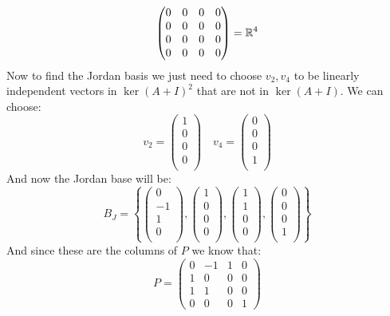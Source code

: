 \documentclass[11pt, a4paper]{article}
\begin{document}
\begin{solution}
\begin{align*}
    \left(\begin{matrix}
    0 & 0 & 0 & 0 \\
    0 & 0 & 0 & 0 \\
    0 & 0 & 0 & 0 \\
    0 & 0 & 0 & 0
    \end{matrix}\right) = \mathbb{R}^4
  \end{align*}
  Now to find the Jordan basis we just need to choose $v_2, v_4$ to
  be linearly independent vectors in $\ker(A+I)^2$ that are not in
  $\ker(A+I)$. We can choose:
  \[
    v_2 = \begin{pmatrix}1 \\ 0\\ 0\\ 0\\ \end{pmatrix} \quad
    v_4 = \begin{pmatrix}0 \\ 0\\ 0\\ 1\\ \end{pmatrix}
  \]
  And now the Jordan base will be:
  \[
    B_J = 
    \left\{
    \begin{pmatrix}0 \\ -1\\ 1\\ 0\\ \end{pmatrix},
    \begin{pmatrix}1 \\ 0\\ 0\\ 0\\ \end{pmatrix},
    \begin{pmatrix}1 \\ 1\\ 0\\ 0\\ \end{pmatrix},
    \begin{pmatrix}0 \\ 0\\ 0\\ 1\\ \end{pmatrix}
    \right\}
  \]
  And since these are the columns of $P$ we know that:
  \[
    P = 
    \left(\begin{matrix}
    0 & -1 & 1 & 0 \\
    1 & 0 & 0 & 0 \\
    1 & 1 & 0 & 0 \\
    0 & 0 & 0 & 1
    \end{matrix}\right)
  \]
\end{solution}
\end{document}
